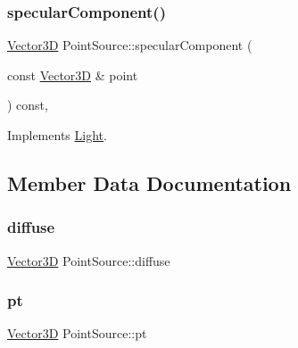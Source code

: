 \subsubsection{\texorpdfstring{specularComponent()}{specularComponent()}}
{\footnotesize\ttfamily \mbox{\hyperlink{classVector3D}{Vector3D}} Point\+Source\+::specular\+Component (\begin{DoxyParamCaption}\item[{const \mbox{\hyperlink{classVector3D}{Vector3D}} \&}]{point }\end{DoxyParamCaption}) const\hspace{0.3cm}{\ttfamily [override]}, {\ttfamily [virtual]}}



Implements \mbox{\hyperlink{classLight_a2a4cdf8081c2cab02757c2464610a32f}{Light}}.



\subsection{Member Data Documentation}
\mbox{\label{classPointSource_af56ac7fa441b50c514037dd624d7c184}} 
\subsubsection{\texorpdfstring{diffuse}{diffuse}}
{\footnotesize\ttfamily \mbox{\hyperlink{classVector3D}{Vector3D}} Point\+Source\+::diffuse\hspace{0.3cm}{\ttfamily [private]}}

\mbox{\label{classPointSource_a42114a0433eca4114a77a3f8cb9e41e1}} 
\subsubsection{\texorpdfstring{pt}{pt}}
{\footnotesize\ttfamily \mbox{\hyperlink{classVector3D}{Vector3D}} Point\+Source\+::pt\hspace{0.3cm}{\ttfamily [private]}}

\mbox{\label{classPointSource_ae02434997baef2749ca6eaa61e98e496}} 
